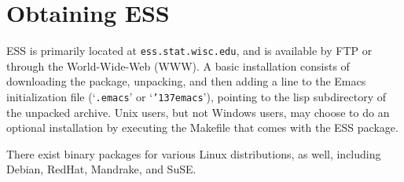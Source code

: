 \documentclass{article}
\newcommand*{\XLispStat}{\textsc{XLispStat}}
\newcommand*{\Stata}{\textsc{Stata}}
\newcommand{\stexttt}[1]{{\small\texttt{#1}}}
\newcommand{\US}{{\char'137}}        %
\newcommand{\file}[1]{`\stexttt{#1}'}
\begin{document}

\singlespace



\appendix
\section{Obtaining ESS}
\label{sec:getIt}

ESS is primarily located at \stexttt{ess.stat.wisc.edu}, and is
available by FTP or through the World-Wide-Web (WWW).  A basic
installation consists of downloading the package, unpacking, and then
adding a line to the Emacs initialization file (\file{.emacs} or
\file{\US emacs}), pointing to the lisp subdirectory of the unpacked
archive.  Unix users, but not Windows users, may choose to do an
optional installation by executing the Makefile that comes with the
ESS package.

There exist binary packages for various Linux distributions, as well,
including Debian, RedHat, Mandrake, and SuSE.
\end{document}
